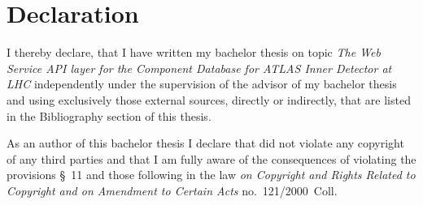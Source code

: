 
\newpage
\null
\vfill
\section*{Declaration}
I thereby declare, that I have written my bachelor thesis on topic \emph{The Web Service API layer for the Component Database for ATLAS Inner Detector at LHC} independently under the supervision of the advisor of my bachelor thesis and using exclusively those external sources, directly or indirectly, that are listed in the Bibliography section of this thesis.

As an author of this bachelor thesis I declare that did not violate any copyright of any third parties and that I am fully aware of the consequences of violating the provisions §~11 and those following in the law \emph{on Copyright and Rights Related to Copyright and on Amendment to Certain Acts} no.~121/2000~Coll.

\vspace{\baselineskip}


